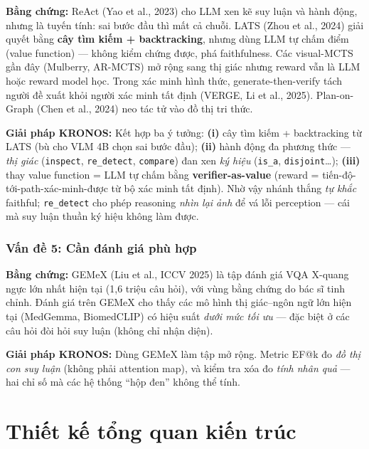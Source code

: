 \documentclass[11pt,a4paper]{article}
\begin{document}
\textbf{Bằng chứng:} ReAct (Yao et al., 2023) cho LLM xen kẽ suy luận và hành động, nhưng là tuyến tính: sai bước đầu thì mất cả chuỗi. LATS (Zhou et al., 2024) giải quyết bằng \textbf{cây tìm kiếm + backtracking}, nhưng dùng LLM tự chấm điểm (value function) --- không kiểm chứng được, phá faithfulness. Các visual-MCTS gần đây (Mulberry, AR-MCTS) mở rộng sang thị giác nhưng reward vẫn là LLM hoặc reward model học. Trong xác minh hình thức, generate-then-verify tách người đề xuất khỏi người xác minh tất định (VERGE, Li et al., 2025). Plan-on-Graph (Chen et al., 2024) neo tác tử vào đồ thị tri thức.

\textbf{Giải pháp KRONOS:} Kết hợp ba ý tưởng: \textbf{(i)} cây tìm kiếm + backtracking từ LATS (bù cho VLM 4B chọn sai bước đầu); \textbf{(ii)} hành động đa phương thức --- \emph{thị giác} (\texttt{inspect}, \texttt{re\_detect}, \texttt{compare}) đan xen \emph{ký hiệu} (\texttt{is\_a}, \texttt{disjoint}\ldots); \textbf{(iii)} thay value function = LLM tự chấm bằng \textbf{verifier-as-value} (reward = tiến-độ-tới-path-xác-minh-được từ bộ xác minh tất định). Nhờ vậy nhánh thắng \emph{tự khắc} faithful; \texttt{re\_detect} cho phép reasoning \emph{nhìn lại ảnh} để vá lỗi perception --- cái mà suy luận thuần ký hiệu không làm được.

\subsubsection{Vấn đề 5: Cần đánh giá phù hợp}

\textbf{Bằng chứng:} GEMeX (Liu et al., ICCV 2025) là tập đánh giá VQA X-quang ngực lớn nhất hiện tại (1,6 triệu câu hỏi), với vùng bằng chứng do bác sĩ tinh chỉnh. Đánh giá trên GEMeX cho thấy các mô hình thị giác--ngôn ngữ lớn hiện tại (MedGemma, BiomedCLIP) có hiệu suất \emph{dưới mức tối ưu} --- đặc biệt ở các câu hỏi đòi hỏi suy luận (không chỉ nhận diện).

\textbf{Giải pháp KRONOS:} Dùng GEMeX làm tập mở rộng. Metric EF@k đo \emph{đồ thị con suy luận} (không phải attention map), và kiểm tra xóa đo \emph{tính nhân quả} --- hai chỉ số mà các hệ thống ``hộp đen'' không thể tính.

\section{Thiết kế tổng quan kiến trúc}
\end{document}
